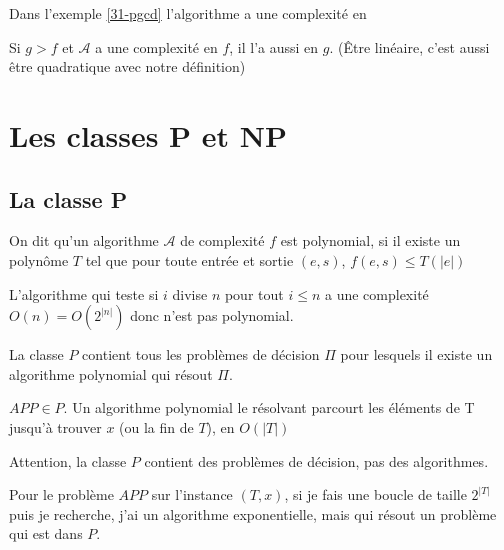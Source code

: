 \begin{example}
	Dans l'exemple \ref{31-pgcd} l'algorithme a une complexité en 
\end{example}

\begin{rem}
	Si $g > f$ et $\mathcal A$ a une complexité en $f$, il l'a aussi en $g$. (Être linéaire, c'est aussi être quadratique avec notre définition)
\end{rem}

\section{Les classes P et NP}

\subsection{La classe P}

\begin{definition}
	On dit qu'un algorithme $\mathcal A$ de complexité $f$ est polynomial, si il existe un polynôme $T$ tel que pour toute entrée et sortie $(e, s)$, $f(e, s) \leq T(|e|)$
\end{definition}

\begin{rem}
	L'algorithme qui teste si $i$ divise $n$ pour tout $i \leq n$ a une complexité $O(n) = O (2^{|n|})$ donc n'est pas polynomial.
\end{rem}

\begin{definition}
	La classe $P$ contient tous les problèmes de décision $\Pi$ pour lesquels il existe un algorithme polynomial qui résout $\Pi$.
\end{definition}

\begin{example}
	$APP \in P$. Un algorithme polynomial le résolvant parcourt les éléments de T jusqu'à trouver $x$ (ou la fin de $T$), en $O(|T|)$
\end{example}

\begin{rem}
	Attention, la classe $P$ contient des problèmes de décision, pas des algorithmes.
\end{rem}

\begin{example}
	Pour le problème $APP$ sur l'instance $(T, x)$, si je fais une boucle de taille $2^{|T|}$ puis je recherche, j'ai un algorithme exponentielle, mais qui résout un problème qui est dans $P$.
\end{example}

